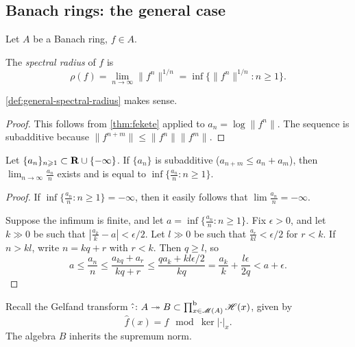 \subsection{Banach rings: the general case}

Let $A$ be a Banach ring, $f\in A$. 

\begin{definition}\label{def:general-spectral-radius}
The \emph{spectral radius} of $f$ is 
\[
  \rho(f) = \lim_{n\to \infty} \|f^n\|^{1/n} = \inf\{\|f^n\|^{1/n}\colon n\geqslant 1\} .
\]
\end{definition}

\begin{lemma}
\autoref{def:general-spectral-radius} makes sense. 
\end{lemma}
\begin{proof}
This follows from \autoref{thm:fekete} applied to $a_n=\log\|f^n\|$. The 
sequence is subadditive because $\|f^{n+m}\| \leqslant \|f^n\| \|f^m\|$.
\end{proof}

\begin{theorem}[Fekete]\label{thm:fekete}
Let $\{a_n\}_{n\geqslant 1}\subset \mathbf{R}\cup\{-\infty\}$. If $\{a_n\}$ is 
subadditive ($a_{n+m}\leqslant a_n+a_m$), then 
$\lim_{n\to \infty} \frac{a_n}{n}$ exists and is equal to 
$\inf\{\frac{a_n}{n}\colon n\geqslant 1\}$. 
\end{theorem}
\begin{proof}
If $\inf\{\frac{a_n}{n}\colon n\geqslant 1\}=-\infty$, then it easily follows 
that $\lim \frac{a_n}{n}=-\infty$. 

Suppose the infimum is finite, and let 
$a=\inf\{\frac{a_n}{n}\colon n\geqslant 1\}$. Fix $\epsilon>0$, and let 
$k\gg 0$ be such that $\left|\frac{a_k}{k}-a\right|<\epsilon/2$. Let $l\gg 0$ 
be such that $\frac{a_r}{kl}<\epsilon/2$ for $r<k$. If $n>k l$, write  
$n=kq+r$ with $r<k$. Then $q\geqslant l$, so 
\[
  a \leqslant \frac{a_n}{n} \leqslant \frac{a_{kq}+a_r}{kq+r} \leqslant \frac{q a_k + kl\epsilon/2}{kq} = \frac{a_k}{k} + \frac{l\epsilon}{2q} < a+\epsilon .
\]
\end{proof}

Recall the Gelfand transform 
$\hat\cdot\colon A\twoheadrightarrow B\subset \prod^\mathrm{b}_{x\in \operatorname{\mathscr{M}}(A)} \mathscr{H}(x)$, given by 
\[
  \hat f(x) = f\mod{\ker|\cdot|_x} .
\]
The algebra $B$ inherits the supremum norm.  

